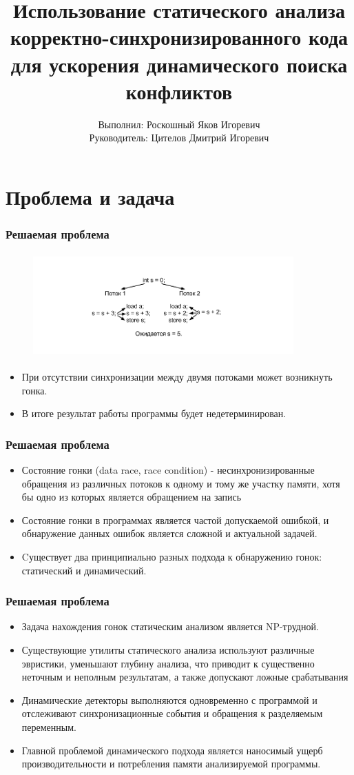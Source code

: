 \documentclass[t]{beamer}  %
\title{Использование статического анализа \\ корректно-синхронизированного кода \\ для ускорения динамического поиска конфликтов}
\subtitle{}
\author{Выполнил: Роскошный Яков Игоревич \\ Руководитель: Цителов Дмитрий Игоревич}
\institute{Университет ИТМО}
\begin{document}
\frame[plain]{\titlepage}	%

\section{Проблема и задача}
\begin{frame}[fragile]
  \frametitle{Решаемая проблема}

\begin{figure}[h]
\center
\includegraphics[width=10cm,height=4cm]{RaceCondition.png}
\end{figure}

\begin{itemize}
    \item При отсутствии синхронизации между двумя потоками может возникнуть гонка.
    \item В итоге результат работы программы будет недетерминирован.
  \end{itemize}
\end{frame}
\begin{frame}[fragile]
  \frametitle{Решаемая проблема}
\begin{itemize}
    \item Состояние гонки (data race, race condition) - несинхронизированные обращения из различных потоков к одному и тому же участку памяти, хотя бы одно из которых является обращением на запись
    \item Состояние гонки в программах является частой допускаемой ошибкой, и обнаружение данных ошибок является сложной и актуальной задачей.
    \item Cуществует два принципиально разных подхода к обнаружению гонок: статический и динамический.
  \end{itemize}
\end{frame}
\begin{frame}[fragile]
  \frametitle{Решаемая проблема}
\begin{itemize}
    \item Задача нахождения гонок статическим анализом является NP-трудной. 
    \item Существующие утилиты статического анализа используют различные эвристики, уменьшают глубину анализа, что приводит к существенно неточным и неполным результатам, а также допускают ложные срабатывания
    \item Динамические детекторы выполняются одновременно с программой и отслеживают синхронизационные события и обращения к разделяемым переменным.
    \item Главной проблемой динамического подхода является наносимый ущерб производительности и потребления памяти
анализируемой программы.
  \end{itemize}
\end{frame}
\end{document}
